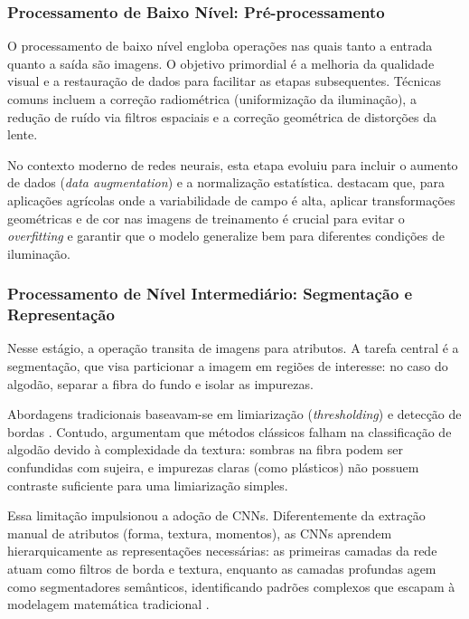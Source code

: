     \subsubsection{Processamento de Baixo Nível: Pré-processamento}
    
        O processamento de baixo nível engloba operações nas quais tanto a entrada quanto a saída são imagens. O objetivo primordial é a melhoria da qualidade visual e a restauração de dados para facilitar as etapas subsequentes. Técnicas comuns incluem a correção radiométrica (uniformização da iluminação), a redução de ruído via filtros espaciais e a correção geométrica de distorções da lente.
        
        No contexto moderno de redes neurais, esta etapa evoluiu para incluir o aumento de dados (\textit{data augmentation}) e a normalização estatística.  destacam que, para aplicações agrícolas onde a variabilidade de campo é alta, aplicar transformações geométricas e de cor nas imagens de treinamento é crucial para evitar o \textit{overfitting} e garantir que o modelo generalize bem para diferentes condições de iluminação.

    \subsubsection{Processamento de Nível Intermediário: Segmentação e Representação}
    
        Nesse estágio, a operação transita de imagens para atributos. A tarefa central é a segmentação, que visa particionar a imagem em regiões de interesse: no caso do algodão, separar a fibra do fundo e isolar as impurezas.
        
        Abordagens tradicionais baseavam-se em limiarização (\textit{thresholding}) e detecção de bordas \cite{sonka1993}. Contudo,  argumentam que métodos clássicos falham na classificação de algodão devido à complexidade da textura: sombras na fibra podem ser confundidas com sujeira, e impurezas claras (como plásticos) não possuem contraste suficiente para uma limiarização simples.
        
        Essa limitação impulsionou a adoção de CNNs. Diferentemente da extração manual de atributos (forma, textura, momentos), as CNNs aprendem hierarquicamente as representações necessárias: as primeiras camadas da rede atuam como filtros de borda e textura, enquanto as camadas profundas agem como segmentadores semânticos, identificando padrões complexos que escapam à modelagem matemática tradicional \cite{lecun2015deep}.

